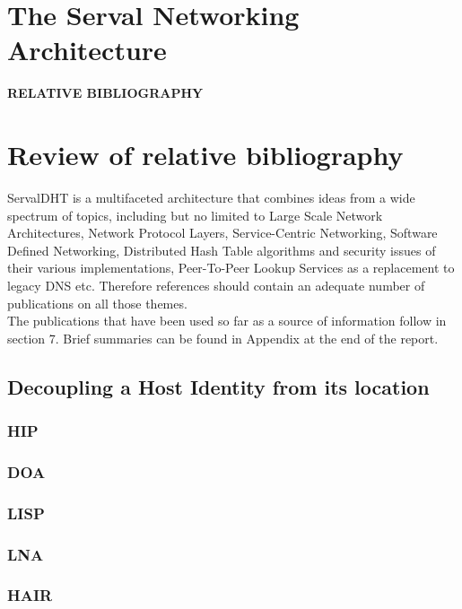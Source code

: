 \documentclass[12pt,a4paper,oneside]{article}
\begin{document}
\newpage
\section{The Serval Networking Architecture}



\newpage
\thispagestyle{empty}
{}
{\Huge \bf \noindent RELATIVE BIBLIOGRAPHY}
\newpage

\section{Review of relative bibliography}
ServalDHT is a multifaceted architecture that combines ideas from a wide spectrum of topics, including but no limited to Large Scale Network Architectures, Network Protocol Layers, Service-Centric Networking, Software Defined Networking, Distributed Hash Table algorithms and security issues of their various implementations, Peer-To-Peer Lookup Services as a replacement to legacy DNS etc.
Therefore references should contain an adequate number of publications on all those themes.\\
\indent The publications that have been used so far as a source of information follow in section 7.
Brief summaries can be found in Appendix at the end of the report.


\subsection{Decoupling a Host Identity from its location}
\subsubsection{HIP}
\subsubsection{DOA}
\subsubsection{LISP}
\subsubsection{LNA}
\subsubsection{HAIR}
\end{document}
